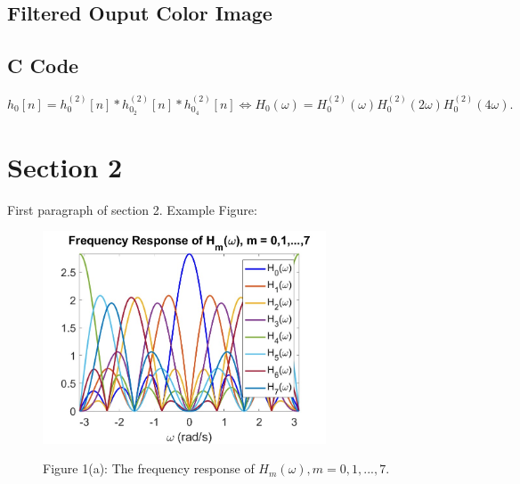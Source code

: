 \documentclass{article}
\begin{document}
\subsection{Filtered Ouput Color Image}
\subsection{C Code}

\begin{equation*}
    h_0[n] = h_{0}^{(2)}[n] \ast h_{0_2}^{(2)}[n] \ast h_{0_4}^{(2)}[n] \iff H_0(\omega) = H_0^{(2)}(\omega)H_0^{(2)}(2\omega)H_0^{(2)}(4\omega).
\end{equation*}

\section{Section 2}
First paragraph of section 2. Example Figure:
\begin{figure}[H]
    \centering
    \includegraphics[width=0.75\textwidth]{figure-example}
    \begin{center}
    Figure 1(a): The frequency response of $H_m(\omega), m = 0,1,...,7$.
    \end{center}
    \label{fig:A1}
\end{figure}
\end{document}
